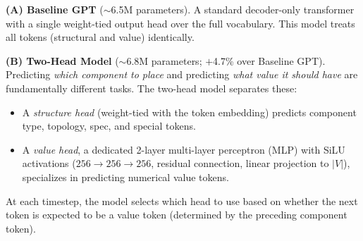 \documentclass[conference]{IEEEtran}
\begin{document}
\textbf{(A) Baseline GPT} ($\sim$6.5M parameters). A standard
decoder-only transformer with a single weight-tied output head
over the full vocabulary. This model treats all tokens (structural
and value) identically.

\textbf{(B) Two-Head Model} ($\sim$6.8M parameters; $+$4.7\% over
Baseline GPT). Predicting \emph{which component to place} and
predicting \emph{what value it should have} are fundamentally
different tasks. The two-head model separates these:
\begin{itemize}
    \item A \emph{structure head} (weight-tied with the token
    embedding) predicts component type, topology, spec, and special
    tokens.
    \item A \emph{value head}, a dedicated 2-layer multi-layer
    perceptron (MLP) with SiLU activations
    ($256 \!\to\! 256 \!\to\! 256$, residual connection, linear
    projection to $|V|$), specializes in predicting numerical value
    tokens.
\end{itemize}
At each timestep, the model selects which head to use based on
whether the next token is expected to be a value token
(determined by the preceding component token).
\end{document}
